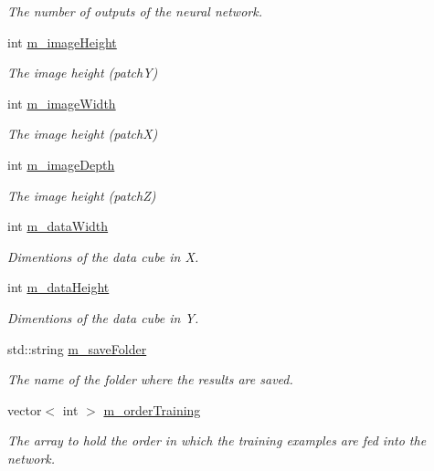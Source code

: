 \begin{DoxyCompactItemize}
\begin{DoxyCompactList}\small\item\em The number of outputs of the neural network. \end{DoxyCompactList}\item 
int \hyperlink{classTrainingAlgorithm_a9e14a50086b4cd73974dab62cd74c722}{m\+\_\+image\+Height}
\begin{DoxyCompactList}\small\item\em The image height (patchY) \end{DoxyCompactList}\item 
int \hyperlink{classTrainingAlgorithm_a9f4488e51911884ae49107bb853099c6}{m\+\_\+image\+Width}
\begin{DoxyCompactList}\small\item\em The image height (patchX) \end{DoxyCompactList}\item 
int \hyperlink{classTrainingAlgorithm_ab3aacb07912b0cd0cc4147b4c0851b1a}{m\+\_\+image\+Depth}
\begin{DoxyCompactList}\small\item\em The image height (patchZ) \end{DoxyCompactList}\item 
int \hyperlink{classTrainingAlgorithm_a48fc87fac249f686265d603f94e16a05}{m\+\_\+data\+Width}
\begin{DoxyCompactList}\small\item\em Dimentions of the data cube in X. \end{DoxyCompactList}\item 
int \hyperlink{classTrainingAlgorithm_ac367cb8900241c4c817d6e5b7f212c4c}{m\+\_\+data\+Height}
\begin{DoxyCompactList}\small\item\em Dimentions of the data cube in Y. \end{DoxyCompactList}\item 
std\+::string \hyperlink{classTrainingAlgorithm_aeff62baa6799a9d12f24a74805b46eea}{m\+\_\+save\+Folder}
\begin{DoxyCompactList}\small\item\em The name of the folder where the results are saved. \end{DoxyCompactList}\item 
vector$<$ int $>$ \hyperlink{classTrainingAlgorithm_acde0233f75f362afcd56890bd9cf3552}{m\+\_\+order\+Training}
\begin{DoxyCompactList}\small\item\em The array to hold the order in which the training examples are fed into the network. \end{DoxyCompactList}\item 

\end{DoxyCompactItemize}
